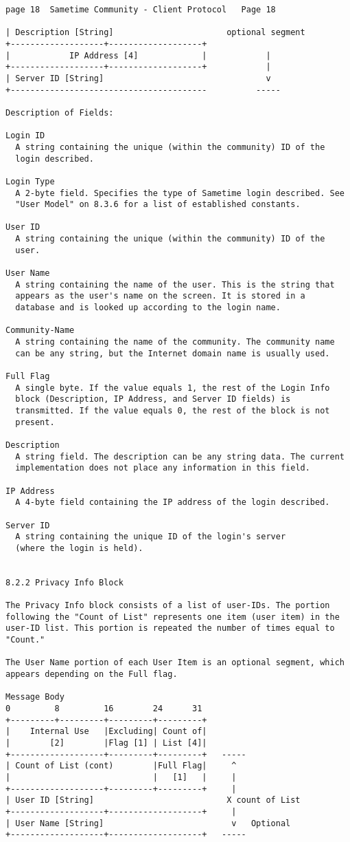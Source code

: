 \documentclass[titlepage,oneside]{book}
\begin{document}
\begin{verbatim}
page 18  Sametime Community - Client Protocol   Page 18

| Description [String]                       optional segment
+-------------------+-------------------+
|            IP Address [4]             |            |
+-------------------+-------------------+            |
| Server ID [String]                                 v
+----------------------------------------          -----

Description of Fields:

Login ID
  A string containing the unique (within the community) ID of the
  login described.

Login Type
  A 2-byte field. Specifies the type of Sametime login described. See
  "User Model" on 8.3.6 for a list of established constants.

User ID
  A string containing the unique (within the community) ID of the
  user.

User Name
  A string containing the name of the user. This is the string that
  appears as the user's name on the screen. It is stored in a
  database and is looked up according to the login name.

Community-Name
  A string containing the name of the community. The community name
  can be any string, but the Internet domain name is usually used.

Full Flag
  A single byte. If the value equals 1, the rest of the Login Info
  block (Description, IP Address, and Server ID fields) is
  transmitted. If the value equals 0, the rest of the block is not
  present.

Description
  A string field. The description can be any string data. The current
  implementation does not place any information in this field.

IP Address
  A 4-byte field containing the IP address of the login described.

Server ID
  A string containing the unique ID of the login's server
  (where the login is held).


8.2.2 Privacy Info Block

The Privacy Info block consists of a list of user-IDs. The portion
following the "Count of List" represents one item (user item) in the
user-ID list. This portion is repeated the number of times equal to
"Count."

The User Name portion of each User Item is an optional segment, which
appears depending on the Full flag.

Message Body
0         8         16        24      31
+---------+---------+---------+---------+
|    Internal Use   |Excluding| Count of|
|        [2]        |Flag [1] | List [4]|
+-------------------+---------+---------+   -----
| Count of List (cont)        |Full Flag|     ^
|                             |   [1]   |     |
+-------------------+---------+---------+     |
| User ID [String]                           X count of List
+-------------------+-------------------+     |
| User Name [String]                          v   Optional
+-------------------+-------------------+   -----


\end{verbatim}
\end{document}
